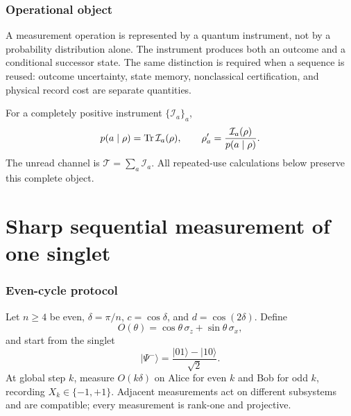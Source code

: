 \documentclass[11pt,a4paper]{article}
\begin{document}
\MakeResearchTitle
\MakeResearchContents
{}
\section{Operational object}
A measurement operation is represented by a quantum instrument, not by a probability distribution alone. The instrument produces both an outcome and a conditional successor state. The same distinction is required when a sequence is reused: outcome uncertainty, state memory, nonclassical certification, and physical record cost are separate quantities.

For a completely positive instrument $\{\mathcal I_a\}_a$,
\begin{equation}
p(a\mid\rho)=\operatorname{Tr}\mathcal I_a(\rho),\qquad
\rho'_a=\frac{\mathcal I_a(\rho)}{p(a\mid\rho)}.
\end{equation}
The unread channel is $\mathcal T=\sum_a\mathcal I_a$. All repeated-use calculations below preserve this complete object.

\part{Sharp sequential measurement of one singlet}
\section{Even-cycle protocol}
Let $n\ge4$ be even, $\delta=\pi/n$, $c=\cos\delta$, and $d=\cos(2\delta)$. Define
\begin{equation}
O(\theta)=\cos\theta\,\sigma_z+\sin\theta\,\sigma_x,
\end{equation}
and start from the singlet
\begin{equation}
|\Psi^-\rangle=\frac{|01\rangle-|10\rangle}{\sqrt2}.
\end{equation}
At global step $k$, measure $O(k\delta)$ on Alice for even $k$ and Bob for odd $k$, recording $X_k\in\{-1,+1\}$. Adjacent measurements act on different subsystems and are compatible; every measurement is rank-one and projective.
\end{document}
